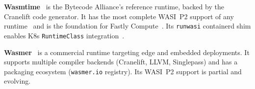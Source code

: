 \begin{table}[htbp]
    \centering
    \caption{Comparative overview of major \acs{Wasm} runtimes considered for this thesis}
    \label{tab:wasm_runtimes}
\end{table}

\begin{sloppypar}
\textbf{Wasmtime}~\cite{bytecodealliance2024wasmtime} is the Bytecode Alliance's reference runtime, backed by the Cranelift code generator. It has the most complete \acs{WASI}~P2 support of any runtime~\cite{bytecodealliance2024wasmtime} and is the foundation for Fastly Compute~\cite{fastly2020lucetwasm, fastly2024compute}. Its \texttt{runwasi} containerd shim enables \acs{K8s} \texttt{RuntimeClass} integration~\cite{runwasi2024}.
\end{sloppypar}

\begin{sloppypar}
\textbf{Wasmer}~\cite{wasmer2024} is a commercial runtime targeting edge and embedded deployments. It supports multiple compiler backends (Cranelift, LLVM, Singlepass) and has a packaging ecosystem (\texttt{wasmer.io} registry). Its \acs{WASI}~P2 support is partial and evolving.
\end{sloppypar}

